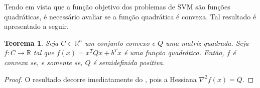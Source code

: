 \documentclass[12pt,a4paper]{scrartcl}
\def\RR{\mathds{R}}
\newtheorem{teo}{Teorema}
\theoremstyle{definition}%
\begin{document}
Tendo em vista que a função objetivo dos problemas de SVM são funções quadráticas, é necessário avaliar se a função quadrática é convexa. Tal resultado é apresentado a seguir.

\begin{teo}
Seja $C \in \RR^{n}$ um conjunto convexo e $Q$ uma matriz quadrada. Seja $f:C \rightarrow \RR$ tal que $f(x) = x^{T}Qx + b^{T}x$ é uma função quadrática. Então, $f$ é convexa se, e somente se, $Q$ é semidefinida positiva.
\end{teo}
\begin{proof}
O resultado decorre imediatamente do , pois a Hessiana $\nabla^{2} f(x) = Q$.
\end{proof}





\newpage

\printbibliography
\end{document}
